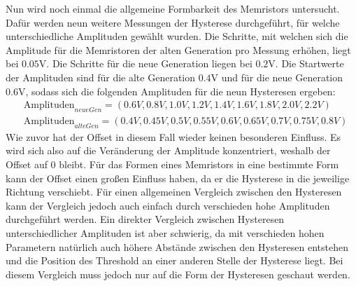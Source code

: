 Nun wird noch einmal die allgemeine Formbarkeit des Memristors untersucht. Dafür werden neun weitere Messungen der Hysterese durchgeführt, für welche unterschiedliche Amplituden gewählt wurden. Die Schritte, mit welchen sich die Amplitude für die Memristoren der alten Generation pro Messung erhöhen, liegt bei $0.05$V. Die Schritte für die neue Generation liegen bei $0.2$V. Die Startwerte der Amplituden sind für die alte Generation $0.4$V und für die neue Generation 0.6V, sodass sich die folgenden Amplituden für die neun Hysteresen ergeben:
\begin{align*}
  &\text{Amplituden}_{neueGen} = (0.6V, 0.8V, 1.0V, 1.2V, 1.4V, 1.6V, 1.8V, 2.0V, 2.2V) \\
  &\text{Amplituden}_{alteGen} = (0.4V, 0.45V, 0.5V, 0.55V, 0.6V, 0.65V, 0.7V, 0.75V, 0.8V)
\end{align*}
Wie zuvor hat der Offset in diesem Fall wieder keinen besonderen Einfluss. Es wird sich also auf die Veränderung der Amplitude konzentriert, weshalb der Offset auf 0 bleibt. Für das Formen eines Memristors in eine bestimmte Form kann der Offset einen großen Einfluss haben, da er die Hysterese in die jeweilige Richtung verschiebt. Für einen allgemeinen Vergleich zwischen den Hysteresen kann der Vergleich jedoch auch einfach durch verschieden hohe Amplituden durchgeführt werden. Ein direkter Vergleich zwischen Hysteresen unterschiedlicher Amplituden ist aber schwierig, da mit verschieden hohen Parametern natürlich auch höhere Abstände zwischen den Hysteresen entstehen und die Position des Threshold an einer anderen Stelle der Hysterese liegt. Bei diesem Vergleich muss jedoch nur auf die Form der Hysteresen geschaut werden.

